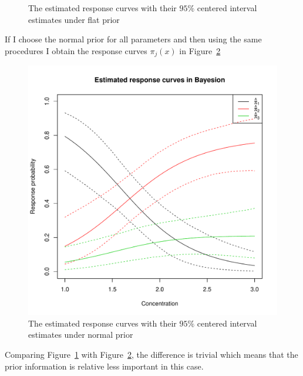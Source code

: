 \documentclass[]{article}
\begin{document}
\begin{enumerate}
{\begin{itemize}
\begin{figure}[ht!]
        		\caption{The estimated response curves with their $95\%$ centered interval estimates under flat prior}
        		\label{2_BERC}
        	\end{figure}
        	If I choose the normal prior for all parameters and then using the same procedures I obtain the response curves $\pi_j(x)$ in Figure~\ref{2_1_BERC}
        	\begin{figure}[ht!]
        		\centering
        		\includegraphics[scale = 0.5]{"pic/HW4_2/BERC_N"}
        		\caption{The estimated response curves with their $95\%$ centered interval estimates under normal prior}
        		\label{2_1_BERC}
        	\end{figure}
        	Comparing Figure~\ref{2_BERC} with Figure~\ref{2_1_BERC}, the difference is trivial which means that the prior information is relative less important in this case.
        	

\end{itemize}}
\end{enumerate}
\end{document}
